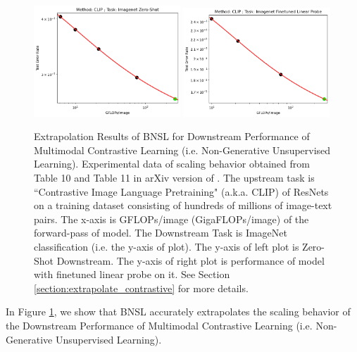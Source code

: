 \documentclass{article} %
\begin{document}
\begin{figure}[htbp]
    \centering
\includegraphics[width=0.49\textwidth]{figures/clip/CLIP__Resnet__Imagenet_Zero-Shot.png}
\includegraphics[width=0.49\textwidth]{figures/clip/CLIP__Resnet__Imagenet_Finetune_Linear_Probe.png}

    \caption{
    Extrapolation Results of BNSL for Downstream Performance of Multimodal Contrastive Learning (i.e. Non-Generative Unsupervised Learning). Experimental data of scaling behavior obtained from Table 10 and Table 11 in arXiv version of \cite{radford2021learning}. The upstream task is ``Contrastive Image Language Pretraining" (a.k.a. CLIP) of ResNets on a training dataset consisting of hundreds of millions of image-text pairs. The x-axis is GFLOPs/image (GigaFLOPs/image) of the forward-pass of model. The Downstream Task is ImageNet classification (i.e. the y-axis of plot). The y-axis of left plot is Zero-Shot Downstream. The y-axis of right plot is performance of model with finetuned linear probe on it. See Section \ref{section:extrapolate_contrastive} for more details.
    }
    \label{fig:extrapolate_audio}
\end{figure}

In Figure \ref{fig:extrapolate_audio}, we show that BNSL accurately extrapolates the scaling behavior of the Downstream Performance of Multimodal Contrastive Learning (i.e. Non-Generative Unsupervised Learning).

\clearpage
\end{document}
